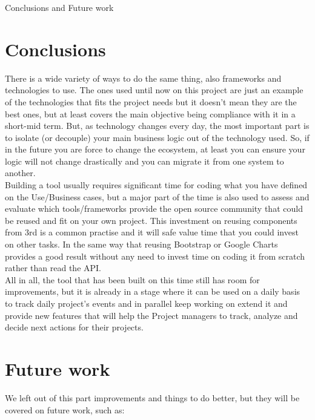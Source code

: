 \begin{part}{Conclusions and Future work}



\chapter{Conclusions}
There is a wide variety of ways to do the same thing, also frameworks and
technologies to use. The ones used until now on this project are just an example
of the technologies that fits the project needs but it doesn't mean they are the best
ones, but at least covers the main objective being compliance with it in a
short-mid term. But, as technology changes every day, the most important part is
to isolate (or decouple) your main business logic out of the technology used.
So, if in the future you are force to change the ecosystem, at least you can ensure your
logic will not change drastically and you can migrate it from one system to
another.\\

Building a tool usually requires significant time for coding what you have
defined on the Use/Business cases, but a major part of the time is also used to
assess and evaluate which tools/frameworks provide the open source community
that could be reused and fit on your own project. This investment on reusing
components from 3rd is a common practise and it will safe value time that you
could invest on other tasks. 
In the same way that reusing Bootstrap or Google
Charts provides a good result without any need to invest time on coding it from
scratch rather than read the API.\\

All in all, the tool that has been built on this time still has room for
improvements, but it is already in a stage where it can be used on a daily basis
to track daily project's events and in parallel keep working on extend it and
provide new features that will help the Project managers to track, analyze and
decide next actions for their projects.

\chapter{Future work}
We left out of this part improvements and things to do better, but they will be
covered on future work, such as:



\end{part}
